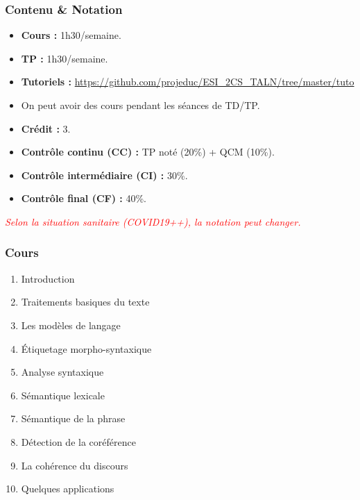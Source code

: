 \documentclass{beamer}
\begin{document}
\begin{frame}
\frametitle{Contenu \& Notation}

\begin{itemize}
	\item \textbf{Cours :} 1h30/semaine.
	\item \textbf{TP :} 1h30/semaine.
	\item \textbf{Tutoriels :} {\scriptsize\url{https://github.com/projeduc/ESI_2CS_TALN/tree/master/tuto}}
	\item On peut avoir des cours pendant les séances de TD/TP.
\end{itemize}

\vfill

\begin{itemize}
	\item \textbf{Crédit :} 3.
	\item \textbf{Contrôle continu (CC) :} TP noté (20\%) + QCM (10\%).
	\item \textbf{Contrôle intermédiaire (CI) :} 30\%.
	\item \textbf{Contrôle final (CF) :} 40\%.
\end{itemize}

\vfill

\textcolor{red}{\itshape Selon la situation sanitaire (COVID19++), la notation peut changer.}

\end{frame}

\begin{frame}
\frametitle{Cours}

\begin{enumerate}
	\item Introduction
	\item Traitements basiques du texte
	\item Les modèles de langage
	\item Étiquetage morpho-syntaxique
	\item Analyse syntaxique
	\item Sémantique lexicale
	\item Sémantique de la phrase
	\item Détection de la coréférence
	\item La cohérence du discours
	\item Quelques applications
\end{enumerate}

\end{frame}
\end{document}
